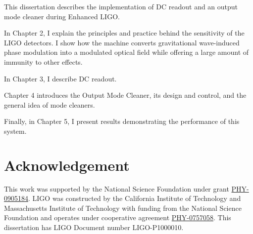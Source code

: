 This dissertation describes the implementation of DC readout and an
output mode cleaner during Enhanced LIGO.

In Chapter 2, I explain the principles and practice behind the
sensitivity of the LIGO detectors.  I show how the machine converts
gravitational wave-induced phase modulation into a modulated optical
field while offering a large amount of immunity to other effects.

In Chapter 3, I describe DC readout.

Chapter 4 introduces the Output Mode Cleaner, its design and control,
and the general idea of mode cleaners.

Finally, in Chapter 5, I present results demonstrating the performance
of this system.


\section{Acknowledgement}

This work was supported by the National Science Foundation under grant
\href{http://www.nsf.gov/awardsearch/showAward.do?AwardNumber=0905184}{PHY-0905184}.
LIGO was constructed by the California Institute of Technology and
Massachusetts Institute of Technology with funding from the National
Science Foundation and operates under cooperative agreement
\href{http://www.nsf.gov/awardsearch/showAward.do?AwardNumber=0757058}{PHY-0757058}.
This dissertation has LIGO Document number LIGO-P1000010.
